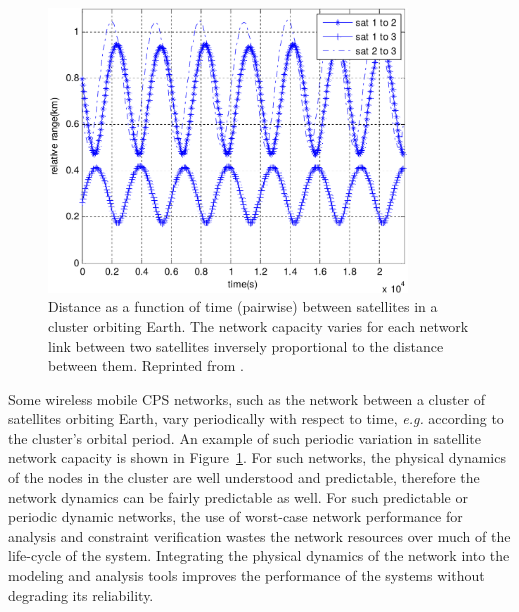 \begin{figure}[ht!]
  \centering
  \includegraphics[width=0.85\textwidth]{figs/cluster_distance.png}
  \caption{Distance as a function of time (pairwise) between
    satellites in a cluster orbiting Earth.  The network capacity
    varies for each network link between two satellites inversely
    proportional to the distance between them.  Reprinted from
    \cite{satellite_distance}.}
  \label{fig:satellite_network}
\end{figure}

Some wireless mobile CPS networks, such as the network between a
cluster of satellites orbiting Earth, vary periodically with respect
to time, \emph{e.g.} according to the cluster's orbital period.  An
example of such periodic variation in satellite network capacity is
shown in Figure~\ref{fig:satellite_network}.  For such networks, the
physical dynamics of the nodes in the cluster are well understood and
predictable, therefore the network dynamics can be fairly predictable
as well.  For such predictable or periodic dynamic networks, the use
of worst-case network performance for analysis and constraint
verification wastes the network resources over much of the life-cycle
of the system. Integrating the physical dynamics of the network into
the modeling and analysis tools improves the performance of the
systems without degrading its reliability.


